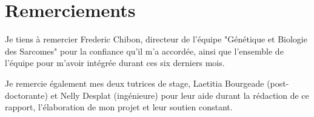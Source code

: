 \setcounter{page}{1}
\chapter*{Remerciements}
\thispagestyle{empty}

Je tiens à remercier Frederic Chibon, directeur de l'équipe "Génétique et Biologie des Sarcomes" pour la confiance qu'il m'a accordée, ainsi que l'ensemble de l'équipe pour m'avoir intégrée durant ces six derniers mois.

Je remercie également mes deux tutrices de stage, Laetitia Bourgeade (post-doctorante) et Nelly Desplat (ingénieure) pour leur aide durant la rédaction de ce rapport, l'élaboration de mon projet et leur soutien constant. 
